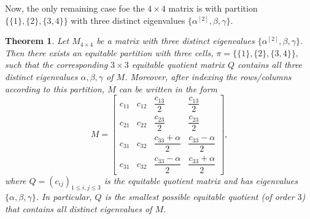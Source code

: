 \documentclass[12pt,twoside]{article}
\newtheorem{theorem}{Theorem}[section]
\begin{document}
Now, the only remaining case foe the $4\times 4$ matrix is with partition $\bigl\{\{1\},\{2\},\{3,4\}\bigr\} $ with three distinct eigenvalues $\{\alpha^{[2]},\beta,\gamma\}.$
\begin{theorem}\label{thm:4x4-three-eigs}
	Let $M_{4\times 4}$ be a matrix with three distinct eigenvalues $\{\alpha^{[2]},\beta,\gamma\}$. Then there exists an equitable partition with three cells, $\pi = \bigl\{\{1\},\{2\},\{3,4\}\bigr\},$ 
	such that the corresponding $3\times 3$ equitable quotient matrix $Q$ contains
	all three distinct eigenvalues $\alpha,\beta,\gamma$ of $M$. Moreover, after
	indexing the rows/columns according to this partition, $M$ can be written in
	the form
	\begin{equation}\label{eq:4x4-M-form}
		M=
		\begin{bmatrix}
			c_{11} & c_{12} & \dfrac{c_{13}}{2} & \dfrac{c_{13}}{2}\\
			c_{21} & c_{22} & \dfrac{c_{23}}{2} & \dfrac{c_{23}}{2}\\
			c_{31} & c_{32} & \dfrac{c_{33}+\alpha}{2} & \dfrac{c_{33}-\alpha}{2}\\
			c_{31} & c_{32} & \dfrac{c_{33}-\alpha}{2} & \dfrac{c_{33}+\alpha}{2}
		\end{bmatrix},
	\end{equation}
	where $Q=(c_{ij})_{1\le i,j\le 3}$ is the equitable quotient matrix and has
	eigenvalues $\{\alpha,\beta,\gamma\}$. In particular, $Q$ is the smallest
	possible equitable quotient (of order $3$) that contains all distinct
	eigenvalues of $M$.
\end{theorem}
\end{document}
